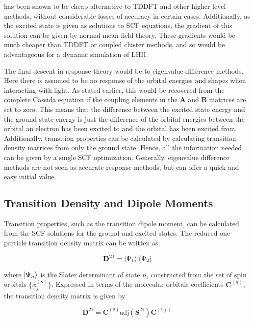 \dscf has been shown to be cheap alternative to TDDFT and other higher level
methods, without considerable losses of accuracy in certain cases\cite{Worster2021}.
Additionally, as the excited state is given as solutions to SCF equations,
the gradient of this solution can be given by normal mean-field theory.
These gradients would be much cheaper than TDDFT or coupled cluster methods, and
so would be advantageous for a dynamic simulation of LHII.

The final descent in response theory would be to eigenvalue difference methods. 
Here there is assumed to be no response of the orbital energies and shapes when 
interacting with light. As stated earlier, this would be recovered from the
complete Cassida equation if the coupling elements in the $\mathbf{A}$ and 
$\mathbf{B}$ matrices are set to zero. This means that the difference between 
the excited state energy and the ground state energy is just the difference of
the orbital energies between the orbital an electron has been excited to and the
orbital has been excited from. Additionally, transition properties can be 
calculated by calculating transition density matrices from only the ground state.
Hence, all the information needed can be given by a single SCF optimization. 
Generally, eigenvalue difference methods are not seen as accurate response methods,
but can offer a quick and easy initial value\cite{Gimon2009}.

\subsection{Transition Density and Dipole Moments}
\label{subsec:dscf_transition_density}
Transition properties, such as the transition dipole moment, can be calculated from
the SCF solutions for the ground and excited states. The reduced one-particle transition
density matrix can be written as:

\begin{equation}
\mathbf{D}^{21} = \ket{\Psi_1} \bra{\Psi_2}
\end{equation}

where $\ket{\Psi_n}$ is the Slater determinant of state $n$, constructed from the
set of spin orbitals $\{ \phi_{j}^{\left(n\right)} \} $. Expressed 
in terms of the molecular orbitals coefficients $\mathbf{C}^{\left(n\right)}$, the
transition density matrix is given by

\begin{equation}
\mathbf{D}^{21} = \mathbf{C}^{\left(2\right)} \text{adj}\left(\mathbf{S}^{21}\right) \mathbf{C}^{\left(1\right) \dagger}
\end{equation}

